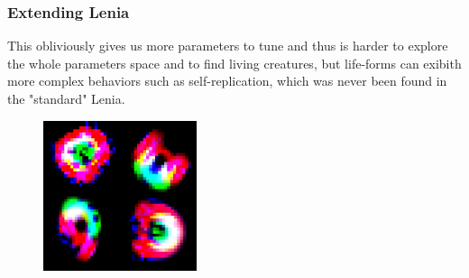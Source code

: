 \documentclass{beamer}
\begin{document}
\begin{frame}
  \frametitle{Extending Lenia}
  This obliviously gives us more parameters to tune and thus is harder to
  explore the whole parameters space and to find living creatures, but life-forms can
  exibith more complex behaviors such as self-replication, which was never been
  found in the "standard" Lenia.
  \begin{figure}
    \begin{center}
      \includegraphics[width=0.4\textwidth]{./creatures_rgb.jpg}
    \end{center}
  \end{figure}
\end{frame}
\end{document}
